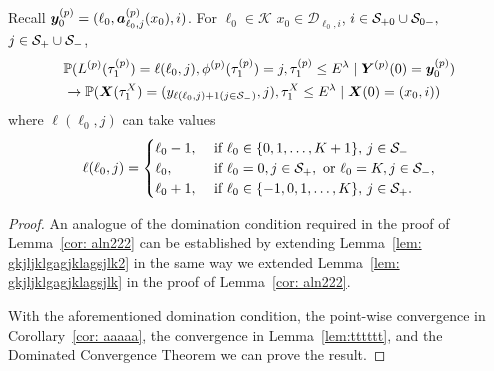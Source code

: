 \begin{cor}\label{cor: aln2222a} Recall \(\boldsymbol y_{0}^{(p)} = (\ell_0, \boldsymbol a_{\ell_0,j}^{(p)}(x_0), i)\). For \(\ell_0\in\mathcal K\) \(x_0\in\mathcal D_{\ell_0,i}\), \(i\in\mathcal S_{+0}\cup\mathcal{S}_{0-},\) \(j\in\mathcal{S}_+\cup\mathcal{S}_-\), 
	\begin{align}
		&\mathbb P(L^{(p)}(\tau_1^{(p)}) = \ell(\ell_0,j), \phi^{(p)}(\tau_1^{(p)}) = j, \tau_{1}^{(p)}\leq E^\lambda 
            	 \mid \boldsymbol Y^{(p)}(0) = \boldsymbol y_0^{(p)}) \nonumber
		\\&\to \mathbb P(\boldsymbol X(\tau_1^X) = (y_{\ell(\ell_0,j)+1(j\in\mathcal{S}_-)}, j), \tau_{1}^X\leq E^\lambda 
            	 \mid \boldsymbol X(0) = (x_0,i))\label{eqn: 14212a}
	\end{align}
	where \(\ell(\ell_0,j)\) can take values
	\begin{align*}
		\ell(\ell_0,j) = \begin{cases}
			\ell_0-1, &\mbox{ if } \ell_0\in\{0,1,\dots,K+1\},\, j\in\mathcal{S}_-\\
			\ell_0, & \mbox{ if } \ell_0 = 0, j\in\mathcal S_+, \mbox{ or }\ell_0 = K, j\in\mathcal S_-,\\
			\ell_0+1, & \mbox{ if } \ell_0\in\{-1,0,1,\dots,K\},\, j\in\mathcal{S}_+.
		\end{cases}
	\end{align*}
\end{cor}
\begin{proof}
	An analogue of the domination condition required in the proof of Lemma~\ref{cor: aln222} can be established by extending Lemma~\ref{lem: gkjljklgagjklagsjlk2} in the same way we extended Lemma~\ref{lem: gkjljklgagjklagsjlk} in the proof of Lemma~\ref{cor: aln222}. 

	With the aforementioned domination condition, the point-wise convergence in Corollary~\ref{cor: aaaaa}, the convergence in Lemma~\ref{lem:tttttt}, and the Dominated Convergence Theorem we can prove the result. 
\end{proof}

